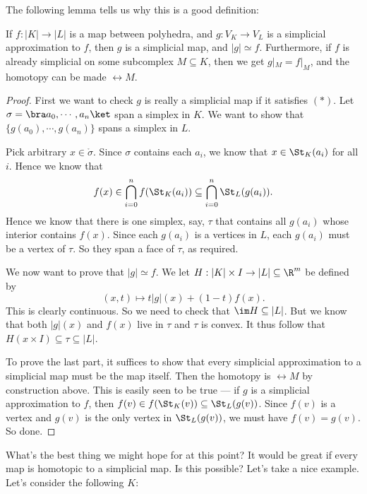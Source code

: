 \documentclass[a4paper]{article}
\begin{document}
The following lemma tells us why this is a good definition:
\begin{lemma}
  If $f: |K| \to |L|$ is a map between polyhedra, and $g: V_K \to V_L$ is a simplicial approximation to $f$, then $g$ is a simplicial map, and $|g| \simeq f$. Furthermore, if $f$ is already simplicial on some subcomplex $M\subseteq K$, then we get $g|_M = f|_M$, and the homotopy can be made $\rel M$.
\end{lemma}

\begin{proof}
  First we want to check $g$ is really a simplicial map if it satisfies $(*)$. Let $\sigma = \bra a_0,\cdots, a_n\ket$ span a simplex in $K$. We want to show that $\{g(a_0), \cdots, g(a_n)\}$ spans a simplex in $L$.

  Pick arbitrary $x \in \mathring{\sigma}$. Since $\sigma$ contains each $a_i$, we know that $x \in \St_K(a_i)$ for all $i$. Hence we know that
  \[
    f(x) \in \bigcap_{i = 0}^n f(\St_K(a_i)) \subseteq \bigcap_{i = 0}^n \St_L(g(a_i)).
  \]
  Hence we know that there is one simplex, say, $\tau$ that contains all $g(a_i)$ whose interior contains $f(x)$. Since each $g(a_i)$ is a vertices in $L$, each $g(a_i)$ must be a vertex of $\tau$. So they span a face of $\tau$, as required.

  We now want to prove that $|g| \simeq f$. We let $H: |K| \times I \to |L| \subseteq \R^m$ be defined by
  \[
    (x, t) \mapsto t |g|(x) + (1 - t)f(x).
  \]
  This is clearly continuous. So we need to check that $\im H \subseteq |L|$. But we know that both $|g|(x)$ and $f(x)$ live in $\tau$ and $\tau$ is convex. It thus follow that $H(x \times I) \subseteq \tau \subseteq |L|$.

  To prove the last part, it suffices to show that every simplicial approximation to a simplicial map must be the map itself. Then the homotopy is $\rel M$ by construction above. This is easily seen to be true --- if $g$ is a simplicial approximation to $f$, then $f(v) \in f(\St_K(v)) \subseteq \St_L(g(v))$. Since $f(v)$ is a vertex and $g(v)$ is the only vertex in $\St_L(g(v))$, we must have $f(v) = g(v)$. So done.
\end{proof}
What's the best thing we might hope for at this point? It would be great if every map is homotopic to a simplicial map. Is this possible? Let's take a nice example. Let's consider the following $K$:
\begin{center}
\end{center}
\end{document}
